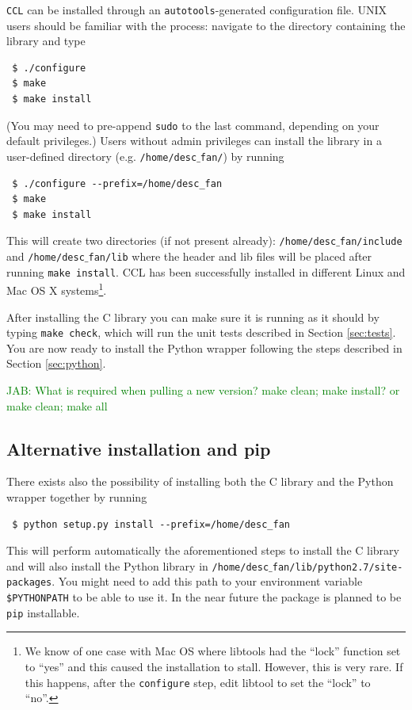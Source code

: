 \documentclass[\docopts]{\docclass}
\newcommand{\jab}[1]{\textcolor{green}{JAB: #1}}
\begin{document}
{\tt CCL} can be installed through an {\tt autotools}-generated configuration file. UNIX users should be familiar with the process: navigate to the directory containing the library and type
\begin{verbatim}
 $ ./configure
 $ make
 $ make install
\end{verbatim}
(You may need to pre-append {\tt sudo} to the last command, depending on your default privileges.) Users without admin privileges can install the library in a user-defined directory (e.g. {\tt /home/desc$\_$fan/}) by running
\begin{verbatim}
 $ ./configure --prefix=/home/desc_fan
 $ make
 $ make install
\end{verbatim}
This will create two directories (if not present already): {\tt /home/desc$\_$fan/include} and {\tt /home/desc$\_$fan/lib} where the header and lib files will be placed after running {\tt make install}. CCL has been successfully installed in different Linux and Mac OS X systems\footnote{We know of one case with Mac OS where libtools had the ``lock'' function set to ``yes'' and this caused the installation to stall. However, this is very rare. If this happens, after the {\tt configure} step, edit libtool to set the ``lock'' to ``no''.}.

After installing the C library you can make sure it is running as it should by typing {\tt make check}, which will run the unit tests described in Section \ref{sec:tests}. You are now ready to install the Python wrapper following the steps described in Section \ref{sec:python}.

\jab{What is required when pulling a new version? make clean; make install? or make clean; make all}

\subsection{Alternative installation and pip}


There exists also the possibility of installing both the C library and the Python wrapper together by running
\begin{verbatim}
 $ python setup.py install --prefix=/home/desc_fan
\end{verbatim}
This will perform automatically the aforementioned steps to install the C library and will also install the Python library in {\tt /home/desc$\_$fan/lib/python2.7/site-packages}. You might need to add this path to your environment variable {\tt \$PYTHONPATH} to be able to use it. In the near future the package is planned to be {\tt pip} installable.
\end{document}
